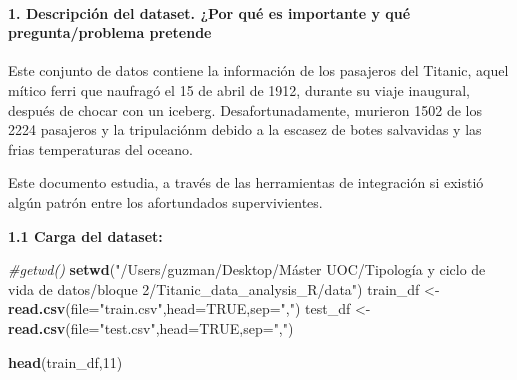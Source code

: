 \documentclass[]{article}
\newenvironment{Shaded}{\begin{snugshade}}{\end{snugshade}}
\newcommand{\CommentTok}[1]{\textcolor[rgb]{0.56,0.35,0.01}{\textit{#1}}}
\newcommand{\DataTypeTok}[1]{\textcolor[rgb]{0.13,0.29,0.53}{#1}}
\newcommand{\DecValTok}[1]{\textcolor[rgb]{0.00,0.00,0.81}{#1}}
\newcommand{\KeywordTok}[1]{\textcolor[rgb]{0.13,0.29,0.53}{\textbf{#1}}}
\newcommand{\NormalTok}[1]{#1}
\newcommand{\OtherTok}[1]{\textcolor[rgb]{0.56,0.35,0.01}{#1}}
\newcommand{\StringTok}[1]{\textcolor[rgb]{0.31,0.60,0.02}{#1}}
\let\oldparagraph\paragraph
\renewcommand{\paragraph}[1]{\oldparagraph{#1}\mbox{}}
\begin{document}
\hypertarget{descripciuxf3n-del-dataset.-por-quuxe9-es-importante-y-quuxe9-preguntaproblema-pretende}{%
\paragraph{1. Descripción del dataset. ¿Por qué es importante y qué
pregunta/problema
pretende}\label{descripciuxf3n-del-dataset.-por-quuxe9-es-importante-y-quuxe9-preguntaproblema-pretende}}

Este conjunto de datos contiene la información de los pasajeros del
Titanic, aquel mítico ferri que naufragó el 15 de abril de 1912, durante
su viaje inaugural, después de chocar con un iceberg.
Desafortunadamente, murieron 1502 de los 2224 pasajeros y la
tripulaciónm debido a la escasez de botes salvavidas y las frias
temperaturas del oceano.

Este documento estudia, a través de las herramientas de integración si
existió algún patrón entre los afortundados supervivientes.

\textbf{1.1 Carga del dataset:}

\begin{Shaded}
\begin{Highlighting}[]
\CommentTok{#getwd()}
\KeywordTok{setwd}\NormalTok{(}\StringTok{"/Users/guzman/Desktop/Máster UOC/Tipología y ciclo de vida de datos/bloque 2/Titanic_data_analysis_R/data"}\NormalTok{)}
\NormalTok{train_df <-}\StringTok{ }\KeywordTok{read.csv}\NormalTok{(}\DataTypeTok{file=}\StringTok{"train.csv"}\NormalTok{,}\DataTypeTok{head=}\OtherTok{TRUE}\NormalTok{,}\DataTypeTok{sep=}\StringTok{","}\NormalTok{)}
\NormalTok{test_df <-}\StringTok{ }\KeywordTok{read.csv}\NormalTok{(}\DataTypeTok{file=}\StringTok{"test.csv"}\NormalTok{,}\DataTypeTok{head=}\OtherTok{TRUE}\NormalTok{,}\DataTypeTok{sep=}\StringTok{","}\NormalTok{)}

\KeywordTok{head}\NormalTok{(train_df,}\DecValTok{11}\NormalTok{)}
\end{Highlighting}
\end{Shaded}
\end{document}
